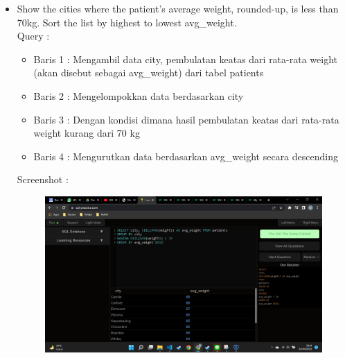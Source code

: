 \documentclass[]{article}
\begin{document}
\begin{itemize}
        \item Show the cities where the patient's average weight, rounded-up, is less than 70kg. Sort the list by highest to lowest avg\_weight.
        \\Query :
        
        \begin{itemize}
            \item Baris 1 : Mengambil data city, pembulatan keatas dari rata-rata weight (akan disebut sebagai avg\_weight) dari tabel patients
            \item Baris 2 : Mengelompokkan data berdasarkan city
            \item Baris 3 : Dengan kondisi dimana hasil pembulatan keatas dari rata-rata weight kurang dari 70 kg
            \item Baris 4 : Mengurutkan data berdasarkan avg\_weight secara descending
        \end{itemize}
        \pagebreak
        Screenshot :
        \begin{figure}[h]
            \includegraphics[scale=0.3]{./Screenshot/Medium-14.png}
            \centering
        \end{figure}


\end{itemize}
\end{document}
